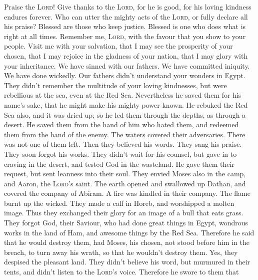  Praise the \textsc{Lord}! Give thanks to the
\textsc{Lord}, for he is good, for his loving kindness endures forever.
 Who can utter the mighty acts of the \textsc{Lord}, or
fully declare all his praise?  Blessed are those who keep
justice. Blessed is one who does what is right at all times.
 Remember me, \textsc{Lord}, with the favour that you show
to your people. Visit me with your salvation,  that I may
see the prosperity of your chosen, that I may rejoice in the gladness of
your nation, that I may glory with your inheritance.  We
have sinned with our fathers. We have committed iniquity. We have done
wickedly.  Our fathers didn't understand your wonders in
Egypt. They didn't remember the multitude of your loving kindnesses, but
were rebellious at the sea, even at the Red Sea. 
Nevertheless he saved them for his name's sake, that he might make his
mighty power known.  He rebuked the Red Sea also, and it
was dried up; so he led them through the depths, as through a desert.
 He saved them from the hand of him who hated them, and
redeemed them from the hand of the enemy.  The waters
covered their adversaries. There was not one of them left.
 Then they believed his words. They sang his praise.
 They soon forgot his works. They didn't wait for his
counsel,  but gave in to craving in the desert, and
tested God in the wasteland.  He gave them their request,
but sent leanness into their soul.  They envied Moses
also in the camp, and Aaron, the \textsc{Lord}'s saint. 
The earth opened and swallowed up Dathan, and covered the company of
Abiram.  A fire was kindled in their company. The flame
burnt up the wicked.  They made a calf in Horeb, and
worshipped a molten image.  Thus they exchanged their
glory for an image of a bull that eats grass.  They
forgot God, their Saviour, who had done great things in Egypt,
 wondrous works in the land of Ham, and awesome things by
the Red Sea.  Therefore he said that he would destroy
them, had Moses, his chosen, not stood before him in the breach, to turn
away his wrath, so that he wouldn't destroy them.  Yes,
they despised the pleasant land. They didn't believe his word,
 but murmured in their tents, and didn't listen to the
\textsc{Lord}'s voice.  Therefore he swore to them that
